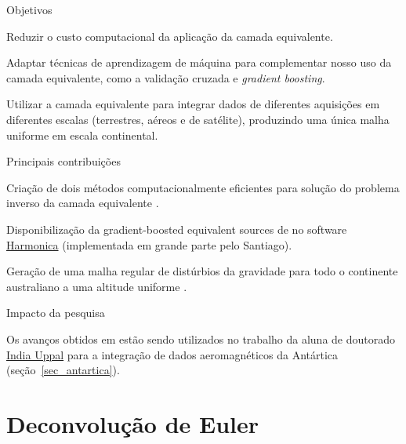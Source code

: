 \documentclass[10pt,a4paper,oneside]{book}
\newcommand{\IndiaLink}{\href{https://www.compgeolab.org/team/\#indiauppal}{India Uppal}}
\begin{document}
\begin{fancyenum}{\faBullseye}{Objetivos}
  \item Reduzir o custo computacional da aplicação da camada equivalente.
  \item Adaptar técnicas de aprendizagem de máquina para complementar nosso
    uso da camada equivalente, como a validação cruzada e \textit{gradient
    boosting}.
  \item Utilizar a camada equivalente para integrar dados de diferentes
    aquisições em diferentes escalas (terrestres, aéreos e de satélite),
    produzindo uma única malha uniforme em escala continental.
\end{fancyenum}
\begin{fancyenum}{\faLightbulb}{Principais contribuições}
  \item Criação de dois métodos computacionalmente eficientes para solução do
    problema inverso da camada equivalente \citep{OliveiraJr2013,Soler2021}.
  \item Disponibilização da gradient-boosted equivalent sources de
    \citet{Soler2021} no software
    \href{https://www.fatiando.org/harmonica/}{Harmonica} (implementada em
    grande parte pelo Santiago).
  \item Geração de uma malha regular de distúrbios da gravidade para todo o
    continente australiano a uma altitude uniforme \citep{Soler2021}.
\end{fancyenum}
\begin{fancyenum}{\faRocket}{Impacto da pesquisa}
  \item Os avanços obtidos em \citet{Soler2021} estão sendo utilizados no
    trabalho da aluna de doutorado \IndiaLink{} para a integração de dados
    aeromagnéticos da Antártica (seção~\ref{sec_antartica}).
\end{fancyenum}


\section{Deconvolução de Euler}
\label{sec_euler}
\end{document}
